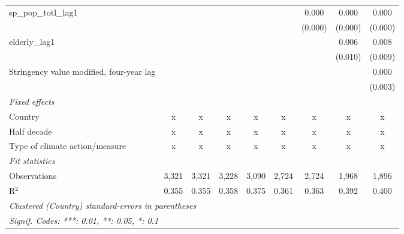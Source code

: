 \begin{tabular}{lcccccccc}
   sp\_pop\_totl\_lag1                                &              &              &              &              &             & 0.000   & 0.000   & 0.000\\   
                                                      &              &              &              &              &             & (0.000) & (0.000) & (0.000)\\   
   elderly\_lag1                                      &              &              &              &              &             &         & 0.006   & 0.008\\   
                                                      &              &              &              &              &             &         & (0.010) & (0.009)\\   
   Stringency value modified, four-year lag           &              &              &              &              &             &         &         & 0.000\\   
                                                      &              &              &              &              &             &         &         & (0.003)\\   
   \emph{Fixed effects}\\
   Country                                            & x            & x            & x            & x            & x           & x       & x       & x\\  
   Half decade                                        & x            & x            & x            & x            & x           & x       & x       & x\\  
   Type of climate action/measure                     & x            & x            & x            & x            & x           & x       & x       & x\\  
   \midrule \emph{Fit statistics}\\
   Observations                                       & 3,321        & 3,321        & 3,228        & 3,090        & 2,724       & 2,724   & 1,968   & 1,896\\  
   R$^2$                                              & 0.355        & 0.355        & 0.358        & 0.375        & 0.361       & 0.363   & 0.392   & 0.400\\  
   \midrule
   \multicolumn{9}{l}{\emph{Clustered (Country) standard-errors in parentheses}}\\
   \multicolumn{9}{l}{\emph{Signif. Codes: ***: 0.01, **: 0.05, *: 0.1}}\\
\end{tabular}
\par\endgroup



